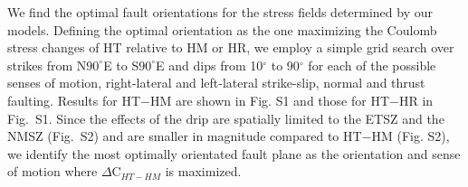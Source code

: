 \documentclass[draft,linenumbers]{agujournal2018}
\begin{document}
    
     We find the optimal fault orientations for the stress fields determined by our models. Defining the optimal orientation as the one maximizing the Coulomb stress changes of HT relative to HM or HR, we employ a simple grid search over strikes from N$90^\circ$E to S$90^\circ$E and dips from 10$^\circ$ to 90$^\circ$     %
     for each of the possible senses of motion, right-lateral and left-lateral strike-slip, normal and thrust faulting. 
     Results for HT$-$HM are shown in Fig. S1 and those for HT$-$HR in Fig.~S1. Since the effects of the drip are spatially limited to the ETSZ and the NMSZ (Fig.~S2) and are smaller in magnitude compared to HT$-$HM (Fig. S2), we identify the most optimally orientated fault plane as the orientation and sense of motion where $\Delta$C$_{HT-HM}$ is maximized.
\end{document}
